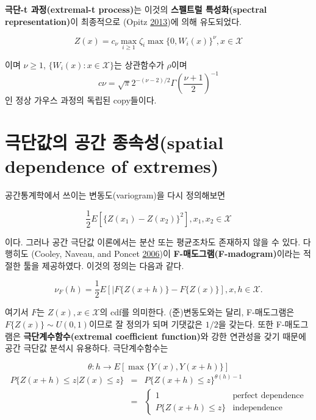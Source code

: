 \documentclass[b5paper,]{book}
\theoremstyle{definition}
\theoremstyle{definition}
\theoremstyle{definition}
\theoremstyle{remark}
\begin{document}
\textbf{극단-t 과정(extremal-t process)}는 이것의 \textbf{스펠트럴
특성화(spectral representation)}이 최종적으로 (Opitz
\protect\hyperlink{ref-Opitz2013}{2013})에 의해 유도되었다.

\begin{equation}
Z(x)=c_{\nu}\max_{i \geq 1}\zeta_{i}\max\{0,W_{i}(x)\}^{\nu}, x\in\mathcal{X}
\end{equation}

이며 \(\nu \geq 1\), \(\{W_{i}(x):x\in\mathcal{X}\}\)는 상관함수가
\(\rho\)이며
\[c\nu =\sqrt{\pi}2^{-(\nu-2)/2}\Gamma(\frac{\nu+1}{2})^{-1}\] 인 정상
가우스 과정의 독립된 copy들이다.

\section{극단값의 공간 종속성(spatial dependence of
extremes)}\label{--spatial-dependence-of-extremes}

공간통계학에서 쓰이는 변동도(variogram)을 다시 정의해보면

\begin{equation}
\frac{1}{2}E[\{Z(x_{1})-Z(x_{2}) \}^{2}], x_{1}, x_{2} \in \mathcal{X}
\end{equation}

이다. 그러나 공간 극단값 이론에서는 분산 또는 평균조차도 존재하지 않을
수 있다. 다행히도 (Cooley, Naveau, and Poncet
\protect\hyperlink{ref-Cooley2006}{2006})이
\textbf{F-매도그램(F-madogram)}이라는 적절한 툴을 제공하였다. 이것의
정의는 다음과 같다.

\begin{equation}
\nu_{F}(h)=\frac{1}{2}E[|F\{Z(x+h)\}-F\{Z(x)\}], x,h\in \mathcal{X}.
\end{equation}

여기서 \(F\)는 \(Z(x), x\in\mathcal{X}\)의 cdf를 의미한다.
(준)변동도와는 달리, F-매도그램은 \(F\{Z(x)\} \sim U(0,1)\)이므로 잘
정의가 되며 기댓값은 \(1/2\)을 갖는다. 또한 F-매도그램은
\textbf{극단계수함수(extremal coefficient function)}와 강한 연관성을
갖기 때문에 공간 극단값 분석시 유용하다. 극단계수함수는

\begin{equation}
\theta : h \rightarrow E[\max \{ Y(x),Y(x+h) \}]
\end{equation}\begin{eqnarray}
P\{Z(x+h)\leq z | Z(x)\leq z\}&=&P\{Z(x+h)\leq z\}^{\theta(h)-1}\nonumber\\
&=&
\begin{cases}
1 & \text{perfect dependence}\\
P\{Z(x+h)\leq z\} & \text{independence}
\end{cases}
\end{eqnarray}
\end{document}
